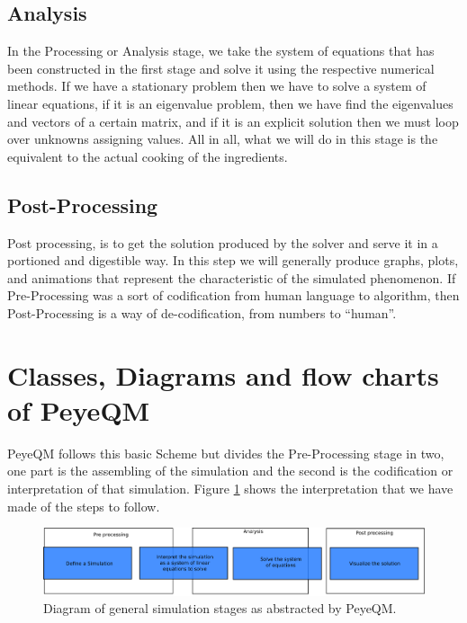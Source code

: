 \subsection{Analysis}
In the Processing or Analysis stage, we take the system of equations that has been constructed in the first stage and solve it using the respective numerical methods. If we have a stationary problem then  we have to solve a system of linear equations, if it is an eigenvalue problem, then we have find the eigenvalues and vectors of a certain matrix, and if it is an explicit solution then we must loop over unknowns assigning values. All in all, what we will do in this stage is the equivalent to the actual cooking of the ingredients. 

\subsection{Post-Processing}
Post processing, is to get the solution produced by the solver and serve it in a portioned and digestible way. In this step we will generally produce graphs, plots, and animations that represent the characteristic of the simulated phenomenon. If Pre-Processing was a sort of codification from human language to algorithm, then Post-Processing is a way of de-codification, from numbers to ``human''.

\section{Classes, Diagrams and flow charts of PeyeQM}
PeyeQM follows this basic Scheme but divides the Pre-Processing stage in two, one part is the assembling of the simulation and the second is the codification or interpretation of that simulation. Figure \ref{fig:stages_2} shows the interpretation that we have made of the  steps to follow.
\begin{figure}[h]
\centering
\includegraphics[scale=0.3]{./img/stages_abstract.pdf}
\caption{Diagram of general simulation stages as abstracted by PeyeQM.}
\label{fig:stages_2}
\end{figure}

